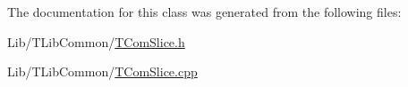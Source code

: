 The documentation for this class was generated from the following files\+:\begin{DoxyCompactItemize}
\item 
Lib/\+T\+Lib\+Common/\hyperlink{_t_com_slice_8h}{T\+Com\+Slice.\+h}\item 
Lib/\+T\+Lib\+Common/\hyperlink{_t_com_slice_8cpp}{T\+Com\+Slice.\+cpp}\end{DoxyCompactItemize}
